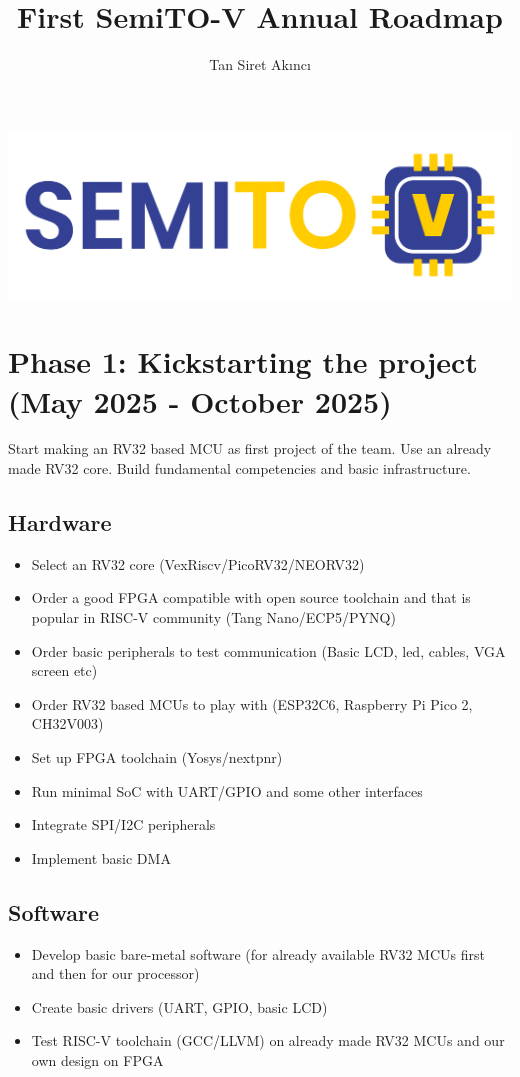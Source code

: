 \documentclass{article}
\title{First SemiTO-V Annual Roadmap}
\author{Tan Siret Akıncı}
\date
\begin{document}
\maketitle
\begin{center}
    \includegraphics[scale=0.7]{semito-v_logo.png}
\end{center}

\section{Phase 1: Kickstarting the project (May 2025 - October 2025)}
Start making an RV32 based MCU as first project of the team. Use an already made RV32 core. Build fundamental competencies and basic infrastructure.

\subsection{Hardware}
\begin{itemize}
    \item Select an RV32 core (VexRiscv/PicoRV32/NEORV32)
    \item Order a good FPGA compatible with open source toolchain and that is popular in RISC-V community (Tang Nano/ECP5/PYNQ)
    \item Order basic peripherals to test communication (Basic LCD, led, cables, VGA screen etc)
    \item Order RV32 based MCUs to play with (ESP32C6, Raspberry Pi Pico 2, CH32V003)
    \item Set up FPGA toolchain (Yosys/nextpnr)
    \item Run minimal SoC with UART/GPIO and some other interfaces
    \item Integrate SPI/I2C peripherals
    \item Implement basic DMA
\end{itemize}

\subsection{Software}
\begin{itemize}
    \item Develop basic bare-metal software (for already available RV32 MCUs first and then for our processor)
    \item Create basic drivers (UART, GPIO, basic LCD)
    \item Test RISC-V toolchain (GCC/LLVM) on already made RV32 MCUs and our own design on FPGA
\end{itemize}
\end{document}

